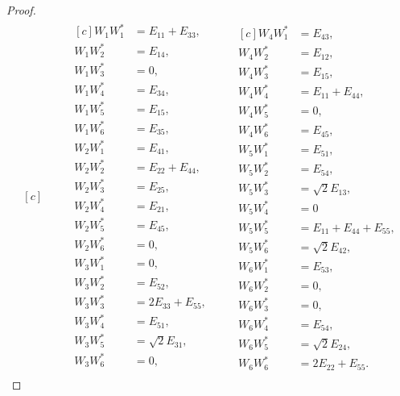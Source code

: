 \documentclass[10pt,reqno]{amsart}
\theoremstyle{definition}
\theoremstyle{plain}
\theoremstyle{remark}
\numberwithin{equation}{section}%
\begin{document}
\begin{proof}
\begin{align*}
\begin{aligned}[c]
			\end{aligned}
			\qquad
			\begin{aligned}[c]
				   W_1W_1^*&=E_{11}+E_{33},\\
					W_1W_2^*&=E_{14},\\
					W_1W_3^*&=0,\\
					W_1W_4^*&=E_{34},\\
					W_1W_5^*&=E_{15},\\
					W_1W_6^*&=E_{35},\\
					W_2W_1^*&=E_{41},\\
					W_2W_2^*&=E_{22}+E_{44},\\
					W_2W_3^*&=E_{25},\\
					W_2W_4^*&=E_{21},\\
					W_2W_5^*&=E_{45},\\
					W_2W_6^*&=0,\\
					W_3W_1^*&=0,\\
					W_3W_2^*&=E_{52},\\
					W_3W_3^*&=2E_{33}+E_{55},\\
					W_3W_4^*&=E_{51},\\
					W_3W_5^*&=\sqrt{2}E_{31},\\
					W_3W_6^*&=0,\\
			\end{aligned}
			\qquad 
			\begin{aligned}[c]
					W_4W_1^*&=E_{43},\\
					W_4W_2^*&=E_{12},\\
					W_4W_3^*&=E_{15},\\
					W_4W_4^*&=E_{11}+E_{44},\\
					W_4W_5^*&=0,\\
					W_4W_6^*&=E_{45},\\
					W_5W_1^*&=E_{51},\\
					W_5W_2^*&=E_{54},\\
					W_5W_3^*&=\sqrt{2}E_{13},\\
					W_5W_4^*&=0\\
					W_5W_5^*&=E_{11}+E_{44}+E_{55},\\
					W_5W_6^*&=\sqrt{2}E_{42},\\
					W_6W_1^*&=E_{53},\\
					W_6W_2^*&=0,\\
					W_6W_3^*&=0,\\
					W_6W_4^*&=E_{54},\\
					W_6W_5^*&=\sqrt{2}E_{24},\\
					W_6W_6^*&=2E_{22}+E_{55}.
				\end{aligned}
			\end{align*}
	\normalsize
	

\end{proof}
\end{document}
